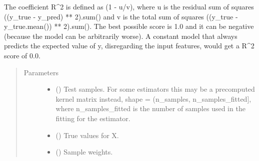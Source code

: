 \documentclass[letterpaper,10pt,english]{sphinxmanual}
\begin{document}
{\begin{fulllineitems}
\begin{fulllineitems}
The coefficient R\textasciicircum{}2 is defined as (1 - u/v), where u is the residual
sum of squares ((y\_true - y\_pred) ** 2).sum() and v is the total
sum of squares ((y\_true - y\_true.mean()) ** 2).sum().
The best possible score is 1.0 and it can be negative (because the
model can be arbitrarily worse). A constant model that always
predicts the expected value of y, disregarding the input features,
would get a R\textasciicircum{}2 score of 0.0.
\begin{quote}\begin{description}
\item[{Parameters}] \leavevmode\begin{itemize}
\item {} 
 (\sphinxstyleliteralemphasis{\sphinxupquote{, }}\sphinxstyleliteralemphasis{\sphinxupquote{ (}}\sphinxstyleliteralemphasis{\sphinxupquote{, }}\sphinxstyleliteralemphasis{\sphinxupquote{)}}) \textendash{} Test samples. For some estimators this may be a
precomputed kernel matrix instead, shape = (n\_samples,
n\_samples\_fitted{]}, where n\_samples\_fitted is the number of
samples used in the fitting for the estimator.

\item {} 
 (\sphinxstyleliteralemphasis{\sphinxupquote{, }}\sphinxstyleliteralemphasis{\sphinxupquote{ (}}\sphinxstyleliteralemphasis{\sphinxupquote{(}}\sphinxstyleliteralemphasis{\sphinxupquote{, }}\sphinxstyleliteralemphasis{\sphinxupquote{)}}) \textendash{} True values for X.

\item {} 
 (\sphinxstyleliteralemphasis{\sphinxupquote{, }}\sphinxstyleliteralemphasis{\sphinxupquote{ {[}}}\sphinxstyleliteralemphasis{\sphinxupquote{{]}}}\sphinxstyleliteralemphasis{\sphinxupquote{, }}) \textendash{} Sample weights.


\end{itemize}
\end{description}
\end{quote}
\end{fulllineitems}
\end{fulllineitems}}
\end{document}
